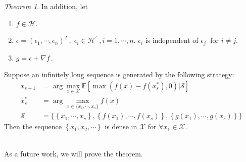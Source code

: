 \documentclass[a4paper,onecolumn]{article}
\theoremstyle{remark}
\newtheorem{theorem}{Theorem}
\begin{document}
{{\begin{theorem}
    In addition, let 
    \begin{enumerate}
        \item $f\in \mathcal{H}$. 
        \item $\epsilon = \left(\epsilon_1,\cdots,\epsilon_n \right)^T\,, 
               \; \epsilon_i\in\mathcal{H}^\prime\;, i=1,\cdots,n$. 
              $\epsilon_i$ is independent of $\epsilon_j\;$ for $i\neq j$.
        \item $
                  g = \epsilon + \nabla f\,.
              $
    \end{enumerate}
    Suppose an infinitely long sequence is generated by the following strategy:
    \begin{equation*}\begin{split}
        x_{s+1} &= \arg\max_{x\in\mathcal{X}} \mathbb{E} \left[
        \max\left( f(x) -  f(x_s^*) ,0\right) \Big| \mathcal{S}
        \right]\\
        x_s^* &= \arg\max_{x\in\{x_1,\cdots,x_s\}}f(x)\\
        \mathcal{S} &= \Big\{ \left\{x_1,\cdots, x_s\right\} ,
        \left\{f(x_1),\cdots, f(x_s)\right\},
        \left\{g(x_1),\cdots, g(x_s)\right\}\Big\}
    \end{split}\end{equation*}
    Then the sequence $\left\{ x_1, x_2, \cdots \right\}$ 
    is dense in $\mathcal{X}$ for $\forall x_1\in \mathcal{X}$.
    \label{theorem: 2}
\end{theorem}
}}\\

\noindent As a future work, we will prove the theorem.
\end{document}
